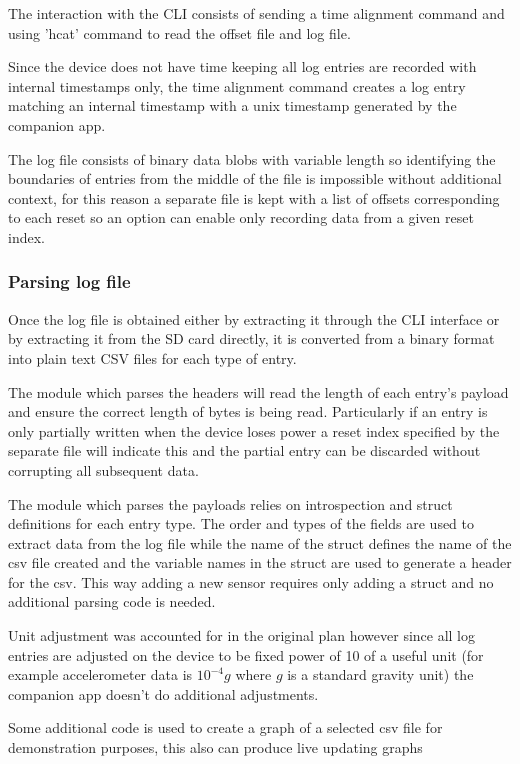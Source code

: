 The interaction with the CLI consists of sending a time alignment command and using 'hcat' command to read the offset file and log file.  

Since the device does not have time keeping all log entries are recorded with internal timestamps only, the time alignment command creates a log entry matching an internal timestamp with a unix timestamp generated by the companion app.  

The log file consists of binary data blobs with variable length so identifying the boundaries of entries from the middle of the file is impossible without additional context, for this reason a separate file is kept with a list of offsets corresponding to each reset so an option can enable only recording data from a given reset index.

\subsubsection{Parsing log file}

Once the log file is obtained either by extracting it through the CLI interface or by extracting it from the SD card directly, it is converted from a binary format into plain text CSV files for each type of entry.

The module which parses the headers will read the length of each entry's payload and ensure the correct length of bytes is being read.  Particularly if an entry is only partially written when the device loses power a reset index specified by the separate file will indicate this and the partial entry can be discarded without corrupting all subsequent data.

The module which parses the payloads relies on introspection and struct definitions for each entry type.  The order and types of the fields are used to extract data from the log file while the name of the struct defines the name of the csv file created and the variable names in the struct are used to generate a header for the csv.  This way adding a new sensor requires only adding a struct and no additional parsing code is needed.

Unit adjustment was accounted for in the original plan however since all log entries are adjusted on the device to be fixed power of 10 of a useful unit (for example accelerometer data is $10^{-4} g$ where $g$ is a standard gravity unit) the companion app doesn't do additional adjustments. 

Some additional code is used to create a graph of a selected csv file for demonstration purposes, this also can produce live updating graphs

